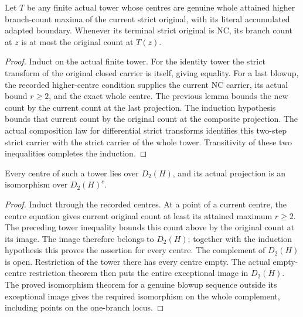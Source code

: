 \begin{lemma}
\label{hir:general-nc-higher-tower-count-over-image}
\leanok
{}
Let $T$ be any finite actual tower whose centres are genuine whole
attained higher branch-count maxima of the current strict original,
with its literal accumulated adapted boundary. Whenever its terminal
strict original is NC, its branch count at $z$ is at most the original
count at $T(z)$.
\end{lemma}
\begin{proof}
Induct on the actual finite tower. For the identity tower the strict
transform of the original closed carrier is itself, giving equality.
For a last blowup, the recorded higher-centre condition supplies the
current NC carrier, its actual bound $r\geq2$, and the exact whole
centre. The previous lemma bounds the new count by the current count
at the last projection. The induction hypothesis bounds that current
count by the original count at the composite projection. The actual
composition law for differential strict transforms identifies this
two-step strict carrier with the strict carrier of the whole tower.
Transitivity of these two inequalities completes the induction.
\end{proof}

\begin{theorem}
\label{hir:general-nc-higher-centres-over-double-locus}
\leanok
{}
Every centre of such a tower lies over $D_2(H)$, and its actual
projection is an isomorphism over $D_2(H)^c$.
\end{theorem}
\begin{proof}
Induct through the recorded centres. At a point of a current centre,
the centre equation gives current original count at least its attained
maximum $r\geq2$. The preceding tower inequality bounds this count
above by the original count at its image. The image therefore belongs
to $D_2(H)$; together with the induction hypothesis this proves the
assertion for every centre. The complement of $D_2(H)$ is open.
Restriction of the tower there has every centre empty. The actual
empty-centre restriction theorem then puts the entire exceptional
image in $D_2(H)$. The proved isomorphism theorem for a genuine blowup
sequence outside its exceptional image gives the required isomorphism
on the whole complement, including points on the one-branch locus.
\end{proof}

